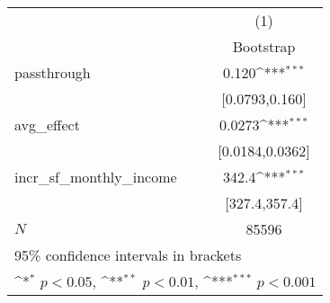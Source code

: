 {
\def\sym#1{\ifmmode^{#1}\else\(^{#1}\)\fi}
\begin{tabular}{l*{1}{c}}
\hline\hline
            &\multicolumn{1}{c}{(1)}        \\
            &\multicolumn{1}{c}{Bootstrap}  \\
\hline
passthrough &                 0.120\sym{***}\\
            &        [0.0793,0.160]         \\
[1em]
avg\_effect  &                0.0273\sym{***}\\
            &       [0.0184,0.0362]         \\
[1em]
incr\_sf\_monthly\_income&                 342.4\sym{***}\\
            &         [327.4,357.4]         \\
\hline
\(N\)       &                 85596         \\
\hline\hline
\multicolumn{2}{l}{\footnotesize 95\% confidence intervals in brackets}\\
\multicolumn{2}{l}{\footnotesize \sym{*} \(p<0.05\), \sym{**} \(p<0.01\), \sym{***} \(p<0.001\)}\\
\end{tabular}
}
